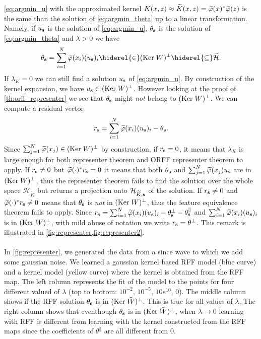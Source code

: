 \cref{eq:argmin_u} with the approximated kernel $K(x,z) \approx
\tildeK{\omega}(x,z) = \tildePhi{\omega}(x)^\adjoint\tildePhi{\omega}(z)$ is
the same than the solution of \cref{eq:argmin_theta} up to a linear
transformation. Namely, if $u_{\boldsymbol{\mathbf{s}}}$ is the solution of \cref{eq:argmin_u},
$\theta_{\boldsymbol{\mathbf{s}}}$ is the solution of \cref{eq:argmin_theta} and $\lambda>0$ we
have 
\begin{dmath*}
    \theta_{\seq{s}} = \sum_{i=1}^{N} \tildePhi{\omega}(x_i) (u_{\seq{s}})_i
    \hiderel{\in} (\Ker W)^{\perp} \hiderel{\subseteq} \tildeH{\omega}.
\end{dmath*} 
If $\lambda_K=0$ we can still find a solution $u_{\boldsymbol{\mathbf{s}}}$ of
\cref{eq:argmin_u}. By construction of the kernel expansion, we have
$u_{\boldsymbol{\mathbf{s}}}\in(\text{Ker}\; W)^\bot$. However looking at the proof of
\cref{th:orff_representer} we see that $\theta_{\boldsymbol{\mathbf{s}}}$ might \emph{not}
belong to $(\text{Ker}\; W)^\bot$. We can compute a residual vector 
\begin{dmath*}
    r_{\seq{s}} = \sum_{i=1}^{N} \tildePhi{\omega}(x_i)
    (u_{\seq{s}})_i - \theta_{\seq{s}}.
\end{dmath*}
Since $\sum_{j=1}^N \tildePhi{\omega}(x_j)\in(\Ker W)^\bot$ by
construction, if $r_{\boldsymbol{\mathbf{s}}}=0$, it means that $\lambda_K$ is large
enough for both representer theorem and \acs{ORFF} representer theorem to
apply. If $r_{\boldsymbol{\mathbf{s}}}\neq 0$ but $\tildePhi{\omega}(\cdot)^\adjoint
r_{\seq{s}} = 0$ it means that both $\theta_{\boldsymbol{\mathbf{s}}}$ and $\sum_{j=1}^{N}
\tildePhi{\omega}(x_j) u_{\seq{s}}$ are in $(\text{Ker}\; W)^\bot$, thus the
representer theorem fails to find the  solution over the whole space
$\mathcal{H}_{\widetilde{K}}$ but returns a projection onto
$\mathcal{H}_{\widetilde{K},\boldsymbol{\mathbf{s}}}$ of the solution. If $r_{\boldsymbol{\mathbf{s}}} \neq
0$ and $\tildePhi{\omega}(\cdot)^\adjoint r_{\seq{s}} \neq 0$ means that
$\theta_{\boldsymbol{\mathbf{s}}}$ is \emph{not} in $(\text{Ker}\; W)^\bot$, thus the feature
equivalence theorem fails to apply. Since $r_{\seq{s}} = \sum_{i=1}^N
\tildePhi{\omega}(x_i)(u_{\seq{s}})_i - \theta_{\seq{s}}^\perp -
\theta_{\seq{s}}^\parallel$ and $\sum_{i=1}^N
\tildePhi{\omega}(x_i)(u_{\seq{s}})_i$ is in $(\text{Ker}\; W)^\perp$, with mild abuse
of notation we write $r_{\boldsymbol{\mathbf{s}}}=\theta^\perp$. This remark is illustrated in
\cref{fig:representer,fig:representer2}.
\paragraph{}
In \cref{fig:representer}, we generated the data from a since wave to which we
add some gaussian noise. We learned a gaussian kernel based \ac{RFF} model
(blue curve) and a kernel model (yellow curve) where the kernel is obtained
from the \acs{RFF} map. The left column represents the fit of the model to the
points for four different valued of $\lambda$ (top to bottom: $10^{-2}$,
$10^{-5}$, $10e^{10}$, $0$). The middle column shows if the \acs{RFF} solution
$\theta_{\boldsymbol{\mathbf{s}}}$ is in $(\text{Ker}\; \tilde{W})^\perp$.  This is true for all values
of $\lambda$. The right column shows that eventhough $\theta_{\boldsymbol{\mathbf{s}}}$ is in
$(\text{Ker}\; \tilde{W})^\perp$, when $\lambda\to0$ learning with \acs{RFF} is
different from learning with the kernel constructed from the \acs{RFF} maps
since the coefficients of $\theta^{\parallel}$ are all different from $0$.
